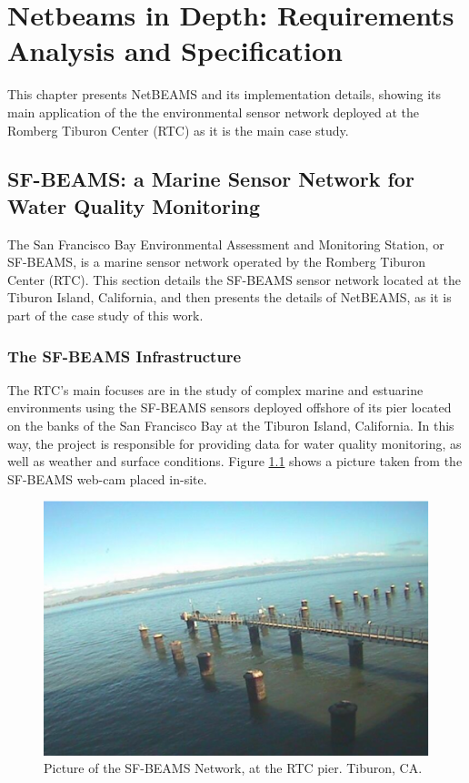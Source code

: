 

\chapter{Netbeams in Depth: Requirements Analysis and Specification}
\label{chap:netbeams-overview}
This chapter presents NetBEAMS and its implementation details, showing its
main application of the the environmental sensor network deployed at the
Romberg Tiburon Center (RTC) as it is the main case study.

\section{SF-BEAMS: a Marine Sensor Network for Water Quality Monitoring}

The San Francisco Bay Environmental Assessment and Monitoring Station,
or SF-BEAMS, is a marine sensor network operated by the Romberg Tiburon Center
(RTC). This section details the SF-BEAMS sensor network located at
the Tiburon Island, California, and then presents the details of NetBEAMS, as
it is part of the case study of this work.

\subsection{The SF-BEAMS Infrastructure}

The RTC's main focuses are in the study of complex marine and estuarine
environments using the SF-BEAMS sensors deployed offshore of its pier located
on the banks of the San Francisco Bay at the Tiburon Island, California. In
this way, the project is responsible for providing data for water quality
monitoring, as well as weather and surface conditions. Figure 
\ref{fig:sf-beams} shows a picture taken from the SF-BEAMS web-cam placed
in-site.

\begin{figure}[!b]
  \centering
    \includegraphics[scale=0.7]{../diagrams/cam_image-oct15}
  \caption{Picture of the SF-BEAMS Network, at the RTC pier. Tiburon, CA.}
  \label{fig:sf-beams}
\end{figure}

